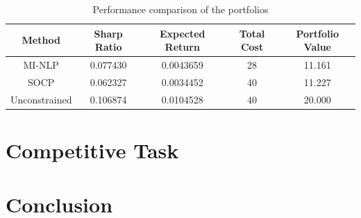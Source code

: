 \documentclass[12pt]{ftec2101}
\begin{document}
\begin{table}
\centering
\begin{tabular}{ccccc}
\toprule  
Method&Sharp Ratio&Expected Return&Total Cost&Portfolio Value\\
\midrule  
MI-NLP&0.077430&0.0043659&28&11.161\\
SOCP&0.062327&0.0034452&40&11.227\\
Unconstrained&0.106874&0.0104528&40&20.000\\
\bottomrule 

\end{tabular}
\caption{Performance comparison of the portfolios}
\label{table:result}
\end{table}
\section{Competitive Task}
\section{Conclusion}

 
\end{document}
